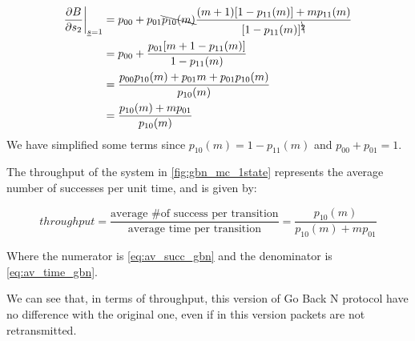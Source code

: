 \begin{equation}\label{eq:av_time_gbn}
	\begin{split}
			\frac{\partial B}{\partial s_2}\bigg|_{\underline{s} = 1} &= p_{00} + p_{01}\bcancel{p_{10}(m)}\frac{(m+1)[1-p_{11}(m)]+mp_{11}(m)}{[1-p_{11}(m)]^{\bcancel{2}}}\\
			&= p_{00} + \frac{p_{01}[m+1-p_{11}(m)]}{1-p_{11}(m)}\\
			&= \frac{p_{00}p_{10}(m)+p_{01}m+p_{01}p_{10}(m)}{p_{10}(m)}\\
			&= \frac{p_{10}(m)+mp_{01}}{p_{10}(m)}
	\end{split}
\end{equation}
We have simplified some terms since $p_{10}(m) = 1-p_{11}(m)$ and $p_{00} + p_{01} = 1$.

The throughput of the system in \autoref{fig:gbn_mc_1state} represents the average number of successes per unit time, and is given by:

\begin{equation}
	throughput = \frac{\text{average \# of success per transition}}{\text{average time per transition}} = \frac{p_{10}(m)}{p_{10}(m) + mp_{01}}
\end{equation}

Where the numerator is \autoref{eq:av_succ_gbn} and the denominator is \autoref{eq:av_time_gbn}.

We can see that, in terms of throughput, this version of Go Back N protocol have no difference with the original one, even if in this version packets are not retransmitted.


